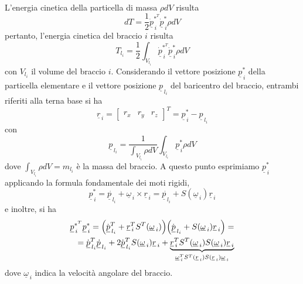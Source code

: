 \paragraph{}
L'energia cinetica della particella di massa $\rho dV$ risulta
\begin{equation}
	dT = \frac{1}{2} \dot{\underline{p}}_{\,i}^{*^T}  \dot{\underline{p}}_{\,i}^* \rho dV
\end{equation}
pertanto, l'energia cinetica del braccio $i$ risulta
\begin{equation}
	T_{l_i} = \frac{1}{2} \int_{V_{l_i}} \dot{\underline{p}}_{\,i}^{*^T}  \dot{\underline{p}}_{\,i}^* \rho dV
\end{equation}
con $V_{l_i}$ il volume del braccio $i$. Considerando il vettore posizione $\underline{p}_{\,i}^*$ della particella elementare e il vettore posizione $\underline{p}_{\,l_i}$ del baricentro del braccio, entrambi riferiti alla terna base si ha
\begin{equation}
	\underline{r}_{\, i} = 
	\begin{bmatrix}
		r_x & r_y & r_z
	\end{bmatrix}^T 	
	= \underline{p}_{\,i}^* - \underline{p}_{\,l_i}
\end{equation}
con 
\begin{equation}
	\underline{p}_{\,l_i} = \frac{1}{\int_{V_{l_i}}\rho dV} \int_{V_{l_i}} \underline{p}_{\,i}^* \rho dV
\end{equation}
dove $\int_{V_{l_i}}\rho dV = m_{l_i}$ è la massa del braccio. A questo punto esprimiamo $\underline{p}_{\,i}^*$ applicando la formula fondamentale dei moti rigidi,
\begin{equation}
	\underline{p}_{\,i}^* = \dot{\underline{p}_{\,l_i}} + \underline{\omega}_{\,i} \times \underline{r}_{\,i} = \dot{\underline{p}_{\,l_i}} + S(\underline{\omega}_{\,i})\underline{r}_{\,i}
\end{equation}
e inoltre, si ha
\begin{align*}
	\underline{p}_{\,i}^{*^T} \underline{p}_{\,i}^* = \Bigl( \dot{\underline{p}}_{\,l_i}^T + \underline{r}_{\,i}^T S^T(\underline{\omega}_{\,i})\Bigr) \Bigl(\dot{\underline{p}}_{\,l_i} + S(\underline{\omega}_{\,i})\underline{r}_{\,i} \Bigr) =\\
	= \dot{\underline{p}}_{\,l_i}^T \underline{\dot{p}}_{\,l_i} + 2\dot{\underline{p}}_{\,l_i}^T S(\underline{\omega}_{\,i}) \underline{r}_{\,i} + \underbrace{\underline{r}_{\,i}^T S^T(\underline{\omega}_{\,i})S(\underline{\omega}_{\,i}) \underline{r}_{\,i}}_{\underline{\omega}_{\,i}^T S^T(\underline{r}_{\,i})S(\underline{r}_{\,i})\underline{\omega}_{\,i}}
\end{align*}
dove $\underline{\omega}_{\,i}$ indica la velocità angolare del braccio.

